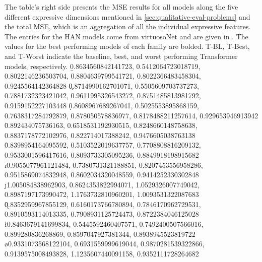 \begin{appendices}
The table's right side presents the MSE results for all models along the five different expressive dimensions mentioned in \ref{sec:qualitative-eval-problems} and the total MSE, which is an aggregation of all the individual expressive features. The entries for the HAN models come from virtuosoNet and are given in \cite{jeong2019virtuosonet}. The values for the best performing models of each family are bolded. T-BL, T-Best, and T-Worst indicate the baseline, best, and worst performing Transformer models, respectively. 
\readlist*{} %
\readlist*\b{0.8634560842141723, 0.5412064723018719, 0.8022146236503704, 0.8804639799541721, 0.8022366483458304, 0.9245564142364828} %
\readlist*\c{0.8714990162701071, 0.5505609703737273, 0.7881732323421042, 0.9611995326543272, 0.8751485813981792, 0.9159152227103448} %
\readlist*\d{0.8608967689267041, 0.5025553895868159, 0.7638317284792879, 0.878050578836977, 0.8178488211257614, 0.929653946913942} %
\readlist*{} %
\readlist*\f{0.892434075736163, 0.6518531192930515, 0.8248660148758638, 0.8837178772102976, 0.822714017388242, 0.9476605038763138} %
\readlist*{} %
\readlist*\h{0.8398954164095592, 0.5103522019637757, 0.7708808816209132, 0.9533001596417616, 0.8093733305095236, 0.8849918198915682} %
\readlist*\i{0.9055077961121484, 0.7380731321188851, 0.8207453556958286, 0.9515869074832948, 0.8602034320048559, 0.9414252330302848} %
\readlist*\j{1.005084838962903, 0.8624353822994071, 1.0529326007749042, 0.8987197173990472, 1.1763732810960201, 1.0093531322087683} %
\readlist*\k{0.8352959967855129, 0.6160173766780894, 0.7846170962729531, 0.8910593114013335, 0.7908931125724473, 0.8722384046125028} %
\readlist*\l{0.8463679141699834, 0.5445592460407571, 0.7492400507566016, 0.899280836268869, 0.8597047927381344, 0.8938945523819722} %
\readlist*{} %
\readlist*{} %
\readlist*\o{0.9331073568122104, 0.6931559999619044, 0.9870281539322866, 0.9139575008493828, 1.1235607440091158, 0.9352111728264682} %


\end{appendices}
